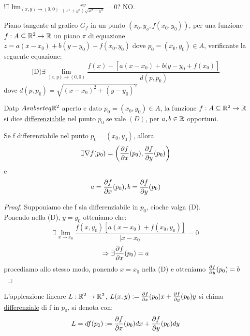 \begin{exercise}
  $!\exists \lim_{(x,y) \to (0,0)} \frac{xy}{(x^2+y^2)\sqrt{x^2+y^2}} = 0$? NO.
\end{exercise}
Piano tangente al grafico $G_f$ in un punto $\left(x_0,y_o,f(x_0,y_0)\right)$, per una funzione $f: A \subseteq \mathbb{R}^2 \to \mathbb{R}$ \ace un piano 
$\pi$ di equazione $z=a(x-x_0)+b(y-y_0)+f(x_0,y_0)$ dove $p_0 = (x_0,y_0)\in A$, verificante la seguente equazione:
$$\text{(D)} \exists \lim_{(x,y)\to (0,0)}\frac{f(x)-\left[a(x-x_0)+b(y-y_0+f(x_0)\right]}{d(p,p_0)}$$
dove $d(p,p_0) = \sqrt{(x-x_0)^2+(y-y_0)^2}$
\begin{definition}
  Datp $A subseteq \mathbb{R}^2$ aperto e dato $p_0=(x_0,y_0)\in A$, la funzione $f: A \subseteq \mathbb{R}^2 \to \mathbb{R}$ si dice \underline{differenziabile}
  nel punto $p_0$ se vale $(D)$, per $a,b \in \mathbb{R}$ opportuni.
\end{definition}
\begin{proposition}
  Se f \ace differenziabile nel punto $p_0 =(x_0,y_0)$, allora $$\exists\nabla f(p_0) = \left(\frac{\partial f}{\partial x}(p_0), \frac{\partial f}{\partial y}(p_0)\right)$$
  e $$a = \frac{\partial f}{\partial x}(p_0) , b =\frac{\partial f}{\partial y}(p_0) $$
  \begin{proof}
    Supponiamo che f sia differenziabile in $p_0$, cio\ace che valga (D). \\
    Ponendo nella (D), $y = y_0$ otteniamo che:
    $$\exists \lim_{x\to x_0} \frac{f(x,y_0) \left[a(x-x_0)+f(x_0,y_0)\right]}{\lvert x -x_0\rvert} = 0$$
    $$\Rightarrow \exists\frac{\partial f}{\partial x}(p_0) = a$$
    procediamo allo stesso modo, ponendo $x=x_0$ nella (D) e otteniamo $\frac{\partial f}{\partial y}(p_0) = b$
  \end{proof}
\end{proposition}
\begin{definition}
  L'applcazione lineare $L:\mathbb{R}^2\to\mathbb{R}^2$, $L(x,y) := \frac{\partial f}{\partial x}(p_0) x + \frac{\partial f}{\partial y}(p_0) y$ si chima \underline{differenziale} di f in $p_0$, si denota
  con: $$L = df(p_0) := \frac{\partial f}{\partial x}(p_0) dx + \frac{\partial f}{\partial y}(p_0) dy$$
\end{definition}